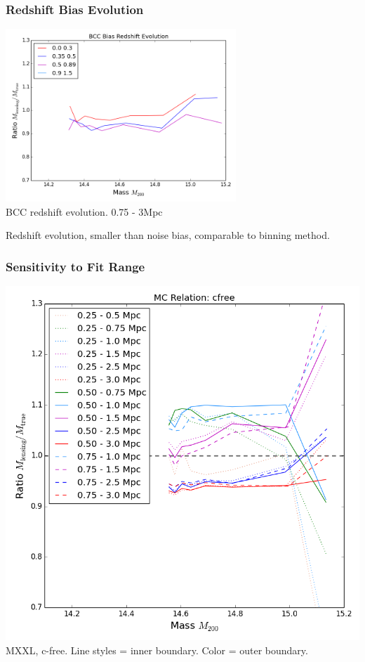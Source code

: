 \documentclass{beamer}
\begin{document}

\begin{frame}
\frametitle{Redshift Bias Evolution}

\centering

\includegraphics[width=0.65\textwidth]{../figures/bcc_bias_redshift_evo_r10_n0_0}\\
\tiny{BCC redshift evolution. 0.75 - 3Mpc}


{\small Redshift evolution, smaller than noise bias, comparable to binning method.}

\end{frame}


\begin{frame}
\frametitle{Sensitivity to Fit Range}

\centering

\includegraphics[height=0.65\textheight]{../figures/cfree}\\

{\small MXXL, c-free. Line styles = inner boundary. Color = outer boundary. }

\end{frame}
\end{document}
